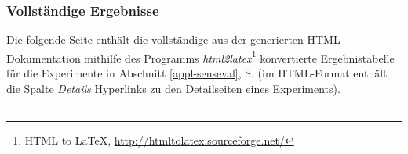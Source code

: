 \documentclass[abstracton, 12pt]{scrartcl}
\begin{document}
\subsubsection{Vollständige Ergebnisse} \label{anhang-erg-wsd}

Die folgende Seite enthält die vollständige aus der generierten HTML-Dokumentation mithilfe des Programms \emph{html2latex}\footnote{HTML to LaTeX, \url{http://htmltolatex.sourceforge.net/}} konvertierte Ergebnistabelle für die Experimente in Abschnitt \ref{appl-senseval}, S. \pageref{appl-senseval} (im HTML-Format enthält die Spalte \emph{Details} Hyperlinks zu den Detailseiten eines Experiments). 

\begin{tiny}
\begin{landscape}
\begin{tabular}{l|l|l|l|l|l}


\end{tabular}
\end{landscape}
\end{tiny}
\end{document}
